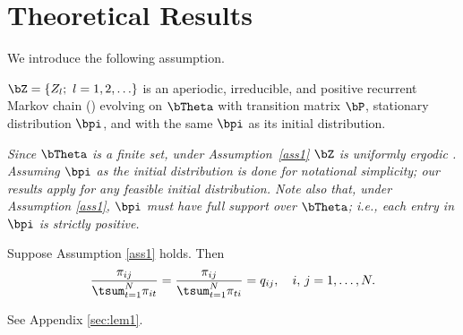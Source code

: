 \documentclass[10pt, twocolumn]{IEEEtran}
\begin{document}

\section{Theoretical Results} \label{sec:theory} 

We introduce the following assumption.
\begin{ass} \label{ass1} $\bZ= \{ {{Z_l}; ~l = 1,2, \ldots }\}$ is an
  aperiodic, irreducible, and positive recurrent Markov chain
  (\cite{jones2004markov}) evolving on ${\bTheta}$ with
  transition matrix $\bP$, stationary distribution ${\bpi}$, and with
  the same ${\bpi}$ as its initial distribution.
\end{ass}

\begin{rem} \label{re1} \emph{Since ${\bTheta}$ is a finite
    set, under Assumption~\ref{ass1} $\bZ$ is uniformly ergodic
    \cite{jones2004markov}. Assuming ${\bpi}$ as the initial
    distribution is done for notational simplicity; our results apply
    for any feasible initial distribution. Note also that, under
    Assumption \ref{ass1}, ${\bpi}$ must have full support over
    ${\bTheta}$; i.e., each entry in ${\bpi}$ is strictly
    positive.}
\end{rem}

\begin{lemma} \label{le1} Suppose Assumption \ref{ass1} holds. Then
\begin{equation}
  \frac{{{\pi _{ij}}}}{{\tsum_{t = 1}^N {{\pi _{it}}} }} = \frac{{{\pi _{ij}}}}{{\tsum_{t = 1}^N {{\pi _{ti}}} }} = {q_{ij}}, \quad i,\,j=1,\ldots,N.
\label{3}
\end{equation}
\end{lemma}
\begin{IEEEproof}
See Appendix \ref{sec:lem1}.
\end{IEEEproof}
\end{document}
